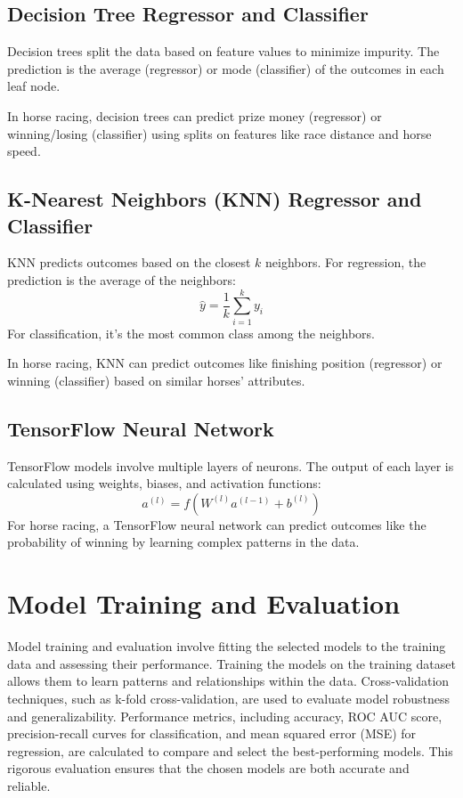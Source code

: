 \documentclass{article}
\begin{document}
\subsection*{Decision Tree Regressor and Classifier}
Decision trees split the data based on feature values to minimize impurity. The prediction is the average (regressor) or mode (classifier) of the outcomes in each leaf node.

In horse racing, decision trees can predict prize money (regressor) or winning/losing (classifier) using splits on features like race distance and horse speed.

\subsection*{K-Nearest Neighbors (KNN) Regressor and Classifier}
KNN predicts outcomes based on the closest \( k \) neighbors. For regression, the prediction is the average of the neighbors:
\begin{equation}
\hat{y} = \frac{1}{k} \sum_{i=1}^k y_i
\end{equation}
For classification, it’s the most common class among the neighbors.

In horse racing, KNN can predict outcomes like finishing position (regressor) or winning (classifier) based on similar horses' attributes.

\subsection*{TensorFlow Neural Network}
TensorFlow models involve multiple layers of neurons. The output of each layer is calculated using weights, biases, and activation functions:
\begin{equation}
a^{(l)} = f(W^{(l)} a^{(l-1)} + b^{(l)})
\end{equation}
For horse racing, a TensorFlow neural network can predict outcomes like the probability of winning by learning complex patterns in the data.

\section*{Model Training and Evaluation}
Model training and evaluation involve fitting the selected models to the training data and assessing their performance. Training the models on the training dataset allows them to learn patterns and relationships within the data. Cross-validation techniques, such as k-fold cross-validation, are used to evaluate model robustness and generalizability. Performance metrics, including accuracy, ROC AUC score, precision-recall curves for classification, and mean squared error (MSE) for regression, are calculated to compare and select the best-performing models. This rigorous evaluation ensures that the chosen models are both accurate and reliable.
\end{document}
